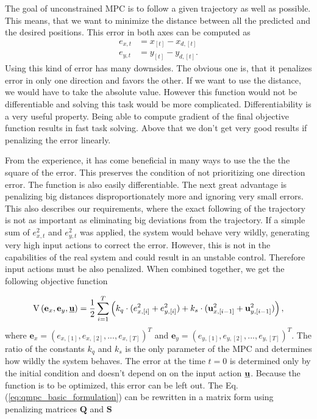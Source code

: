 \documentclass[a4paper,11pt,titlepage]{article}
\newcommand{\uvec}{\textbf{\underline{u}}}
\begin{document}
The goal of unconstrained MPC is to follow a given trajectory as well as possible. This means, that we want to minimize the distance between all the predicted and the desired positions. This error in both axes can be computed as
\begin{equation}
\begin{split}
\label{eq:simple_err}
e_{x, t} &= x_{[t]} - x_{d, [t]}\\
e_{y, t} &= y_{[t]} - y_{d, [t]}.
\end{split}
\end{equation}
Using this kind of error has many downsides. The obvious one is, that it penalizes error in only one direction and favors the other. If we want to use the distance, we would have to take the absolute value. However this function would not be differentiable \cite{stein1970singular} and solving this task would be more complicated. Differentiability is a very useful property. Being able to compute gradient of the final objective function results in fast task solving. Above that we don't get very good results if penalizing the error linearly. 

From the experience, it has come beneficial in many ways to use the the the square of the error. This preserves the condition of not prioritizing one direction error. The function is also easily differentiable. The next great advantage is penalizing big distances disproportionately more and ignoring very small errors. This also describes our requirements, where the exact following of the trajectory is not as important as eliminating big deviations from the trajectory. If a simple sum of $e_{x, t}^2$ and $e_{y, t}^2$ was applied, the system would behave very wildly, generating very high input actions to correct the error. However, this is not in the capabilities of the real system and could result in an unstable control. Therefore input actions must be also penalized. When combined together, we get the following objective function 

\begin{equation}
\label{eq:qmpc_basic_formulation}
\mathrm{V}\left(\textbf{e}_x, \textbf{e}_y, \uvec\right) 
= \frac{1}{2}\sum_{i=1}^{T}\left( k_q \cdot (e^2_{x, [i]}+e^2_{y, [i]}) + k_s \cdot (\textbf{u}^2_{x, [i-1]}+\textbf{u}^2_{y, [i-1]})\right),
\end{equation}
where $\textbf{e}_x = (e_{x, [1]}, e_{x, [2]}, ..., e_{x, [T]})^T$ and $\textbf{e}_y = (e_{y, [1]}, e_{y, [2]}, ..., e_{y, [T]})^T$. The ratio of the constants $k_q$ and $k_s$ is the only parameter of the MPC and determines how wildly the system behaves. The error at the time $t = 0$ is determined only by the initial condition and doesn't depend on on the input action $\uvec$. Because the function is to be optimized, this error can be left out. The Eq. (\ref{eq:qmpc_basic_formulation}) can be rewritten in a matrix form using penalizing matrices $\textbf{Q}$ and $\textbf{S}$
\end{document}
